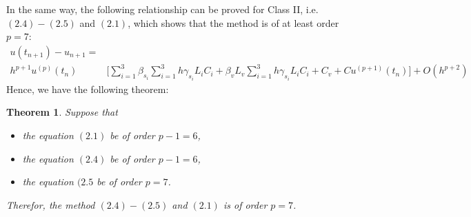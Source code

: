 \documentclass[11pt,twoside, final]{amsart}
\newtheorem{theorem}{Theorem}[section]
\begin{document}
\noindent
In the same way, the following relationship can be proved for  Class II, i.e. $(2.4)-(2.5)$ and $(2.1)$, which shows that the method is of at least order $p=7$:
\begin{align*}\label{}
  u(t_{n+1}) -u_{n+1}=&\\
   h^{p+1}u^{(p)}(t_{n})&\bigg[\sum_{i=1}^{3}\beta_{s_{i}}\sum_{i=1}^{3}h\gamma_{s_{i}}L_{i}C_{i} +\beta_{v}L_{v}\sum_{i=1}^{3}h\gamma_{s_{i}}L_{i}C_{i}+C_{v} 
 +Cu^{(p+1)}(t_{n})\bigg]+O(h^{p+2}) 
\end{align*}
Hence, we have the following theorem:
\begin{theorem}\label{thm1}
 Suppose  that
\begin{itemize}
  \item the equation $(2.1)$ be of order $p-1=6$,
  \item  the equation $(2.4)$ be of order $p-1=6$,
\item  the equation $(2.5$ be of order $p=7$.
\end{itemize}
Therefor, the   method $(2.4)-(2.5)$  and $(2.1)$ is of order   $p=7$.
\end{theorem}
\vspace{0.1 cm}
\end{document}
